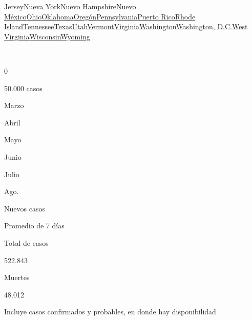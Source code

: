 {Jersey}\href{https://www.nytimes.com/interactive/2020/us/new-york-coronavirus-cases.html}{Nueva
York}\href{https://www.nytimes.com/interactive/2020/us/new-hampshire-coronavirus-cases.html}{Nuevo
Hampshire}\href{https://www.nytimes.com/interactive/2020/us/new-mexico-coronavirus-cases.html}{Nuevo
México}\href{https://www.nytimes.com/interactive/2020/us/ohio-coronavirus-cases.html}{Ohio}\href{https://www.nytimes.com/interactive/2020/us/oklahoma-coronavirus-cases.html}{Oklahoma}\href{https://www.nytimes.com/interactive/2020/us/oregon-coronavirus-cases.html}{Oregón}\href{https://www.nytimes.com/interactive/2020/us/pennsylvania-coronavirus-cases.html}{Pennsylvania}\href{https://www.nytimes.com/interactive/2020/us/puerto-rico-coronavirus-cases.html}{Puerto
Rico}\href{https://www.nytimes.com/interactive/2020/us/rhode-island-coronavirus-cases.html}{Rhode
Island}\href{https://www.nytimes.com/interactive/2020/us/tennessee-coronavirus-cases.html}{Tennessee}\href{https://www.nytimes.com/interactive/2020/us/texas-coronavirus-cases.html}{Texas}\href{https://www.nytimes.com/interactive/2020/us/utah-coronavirus-cases.html}{Utah}\href{https://www.nytimes.com/interactive/2020/us/vermont-coronavirus-cases.html}{Vermont}\href{https://www.nytimes.com/interactive/2020/us/virginia-coronavirus-cases.html}{Virginia}\href{https://www.nytimes.com/interactive/2020/us/washington-coronavirus-cases.html}{Washington}\href{https://www.nytimes.com/interactive/2020/us/washington-dc-coronavirus-cases.html}{Washington,
D.C.}\href{https://www.nytimes.com/interactive/2020/us/west-virginia-coronavirus-cases.html}{West
Virginia}\href{https://www.nytimes.com/interactive/2020/us/wisconsin-coronavirus-cases.html}{Wisconsin}\href{https://www.nytimes.com/interactive/2020/us/wyoming-coronavirus-cases.html}{Wyoming}

~

0

50.000 casos

Marzo

Abril

Mayo

Junio

Julio

Ago.

Nuevos casos

Promedio de 7 días

Total de casos

522.843

Muertes

48.012

Incluye casos confirmados y probables, en donde hay disponibilidad

